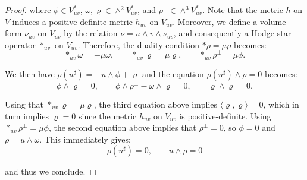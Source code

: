\documentclass[10pt,a4paper]{amsart}
\newcommand{\escal}[1]{\langle#1\rangle}
\begin{document}
\begin{proof}
\noindent
where $\phi\in V_{uv}^*$, $\omega,\varrho\in\wedge^2V_{uv}^*$, and $\rho^\perp\in\wedge^3V_{uv}^*$. Note that the metric $h$ on $V$ induces a positive-definite metric $h_{uv}$ on $V_{uv}$. Moreover, we define a volume form $\nu_{uv}$ on $V_{uv}$ by the relation $\nu=u\wedge v\wedge \nu_{uv}$, and consequently a Hodge star operator $*_{uv}$ on $V_{uv}$. Therefore, the duality condition $*\rho=\mu\rho$ becomes:
\begin{equation*}
*_{uv}\omega=-\mu\omega,\qquad *_{uv}\varrho=\mu\varrho,\qquad *_{uv}\rho^\perp=\mu\phi.
\end{equation*}

\noindent
We then have $\rho(u^\sharp)=-u\wedge\phi+\varrho$ and the equation $\rho(u^\sharp)\wedge\rho=0$ becomes: $$\phi\wedge\varrho=0,\qquad \phi\wedge\rho^\perp-\omega\wedge\varrho=0,\qquad \varrho\wedge\varrho=0.$$

Using that $*_{uv}\varrho=\mu\varrho$, the third equation above implies $\escal{\varrho,\varrho}=0$, which in turn implies $\varrho=0$ since the metric $h_{uv}$ on $V_{uv}$ is positive-definite. Using $*_{uv}\rho^\perp=\mu\phi$, the second equation above implies that $\rho^\perp=0$, so $\phi=0$ and $\rho=u\wedge\omega$. This immediately gives:
\begin{equation*}
\rho(u^\sharp)=0,\qquad u\wedge\rho=0
\end{equation*}

\noindent
and thus we conclude.
\end{proof}
\end{document}
